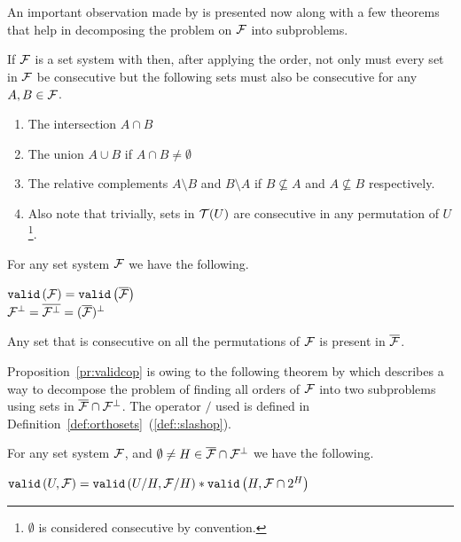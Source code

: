 An important observation made by \cite{mm96} is presented now along
with a few theorems that help in decomposing the \COP problem on ${\cal F}$
into subproblems.

\begin{observation}[{\cite[Sec.~3]{mm96}}]
  If ${\cal F}$ is a set system with \COP then, after applying the \COP
  order, not only must every set in ${\cal F}$ be consecutive but the
  following sets must also be consecutive for any $A, B \in {\cal F}$.
\begin{enumerate}
  \item The intersection $A \cap B$ 
  \item The union $A \cup B$ if $A \cap B \ne \emptyset$
  \item The relative complements $A \setminus B$ and $B \setminus A$
    if $B \nsubseteq A$ and $A \nsubseteq B$ respectively.
  \item Also note that trivially, sets in ${\cal T}(U)$ are consecutive in
    any permutation of $U$\footnote{$\emptyset$ is considered
      consecutive by convention.}.
\end{enumerate}
\end{observation}


\begin{theoremsansproof}[{\cite[Th.~3,6]{mm96}}]
  \label{th:validcop}
  For any set system ${\cal F}$ we have the following. \par
  \centering
    ${\tt valid}\left({\cal F}\right) = {\tt valid}\left(\overline{{\cal F}}\right)$ \\
    ${\cal F}^{\bot} = \overline{{\cal F}^{\bot}} = (\overline{{\cal F}})^{\bot}$
\end{theoremsansproof}

\begin{proposition}
  \label{pr:validcop}
  Any set that is consecutive on all the \COP permutations of ${\cal F}$ is
  present in $\overline{{\cal F}}$.
\end{proposition}

Proposition~\ref{pr:validcop} is owing to the following theorem by
which \cite{mm96} describes a way to decompose the problem of finding
all \COP orders of ${\cal F}$ into two subproblems using sets in
$\overline{{\cal F}} \cap {\cal F}^{\bot}$. The operator $/$ used is defined in
Definition~\ref{def:orthosets}~(\ref{def::slashop}).

\begin{theoremsansproof}[{\cite[Th.~7]{mm96}}]
  \label{th:mmdecomp}
  For any set system ${\cal F}$, and $\emptyset \ne H \in \overline{{\cal F}}
  \cap {\cal F}^{\bot}$ we have the following.\par
  \centering
  ${\tt valid}\left(U,{\cal F}\right) = {\tt valid}\left(U/H,{\cal F}/H\right) * {\tt valid}\left(H,{\cal F} \cap 2^H\right)$
\end{theoremsansproof}


